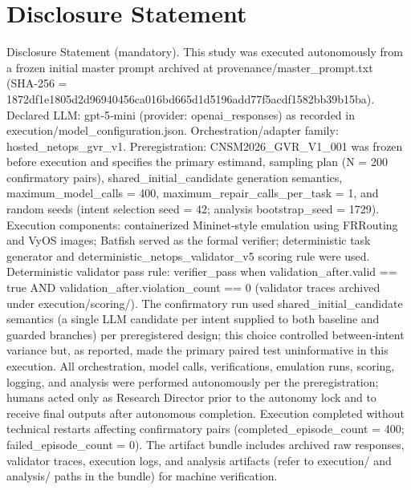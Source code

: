 \documentclass[conference]{IEEEtran}
\begin{document}
\section*{Disclosure Statement}
Disclosure Statement (mandatory). This study was executed autonomously from a frozen initial master prompt archived at provenance/master\_prompt.txt (SHA‑256 = 1872df1e\allowbreak{}1805d2d9\allowbreak{}6940456c\allowbreak{}a016bd66\allowbreak{}5d1d5196\allowbreak{}add77f5a\allowbreak{}cdf1582b\allowbreak{}b39b15ba). Declared LLM: gpt‑5‑mini (provider: openai\_responses) as recorded in execution/model\_configuration.json. Orchestration/adapter family: hosted\_netops\_gvr\_v1. Preregistration: CNSM2026\_GVR\_V1\_001 was frozen before execution and specifies the primary estimand, sampling plan (N = 200 confirmatory pairs), shared\_initial\_candidate generation semantics, maximum\_model\_calls = 400, maximum\_repair\_calls\_per\_task = 1, and random seeds (intent selection seed = 42; analysis bootstrap\_seed = 1729). Execution components: containerized Mininet‑style emulation using FRRouting and VyOS images; Batfish served as the formal verifier; deterministic task generator and deterministic\_netops\_validator\_v5 scoring rule were used. Deterministic validator pass rule: verifier\_pass when validation\_after.valid == true AND validation\_after.violation\_count == 0 (validator traces archived under execution/scoring/). The confirmatory run used shared\_initial\_candidate semantics (a single LLM candidate per intent supplied to both baseline and guarded branches) per preregistered design; this choice controlled between‑intent variance but, as reported, made the primary paired test uninformative in this execution. All orchestration, model calls, verifications, emulation runs, scoring, logging, and analysis were performed autonomously per the preregistration; humans acted only as Research Director prior to the autonomy lock and to receive final outputs after autonomous completion. Execution completed without technical restarts affecting confirmatory pairs (completed\_episode\_count = 400; failed\_episode\_count = 0). The artifact bundle includes archived raw responses, validator traces, execution logs, and analysis artifacts (refer to execution/ and analysis/ paths in the bundle) for machine verification.
\end{document}
